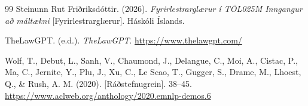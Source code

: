 \documentclass[fleqn]{report}
\begin{document}
\begin{thebibliography}{99}
Steinunn Rut Friðriksdóttir. (2026). \textit{Fyrirlestrarglærur í TÖL025M Inngangur að máltækni} [Fyrirlestrarglærur]. Háskóli Íslands.

TheLawGPT. (e.d.). \textit{TheLawGPT}. \url{https://www.thelawgpt.com/}

Wolf, T., Debut, L., Sanh, V., Chaumond, J., Delangue, C., Moi, A., Cistac, P., Ma, C., Jernite, Y., Plu, J., Xu, C., Le Scao, T., Gugger, S., Drame, M., Lhoest, Q., \& Rush, A. M. (2020).  [Ráðstefnugrein]. 38–45. \url{https://www.aclweb.org/anthology/2020.emnlp-demos.6}

\end{thebibliography}
\end{document}
